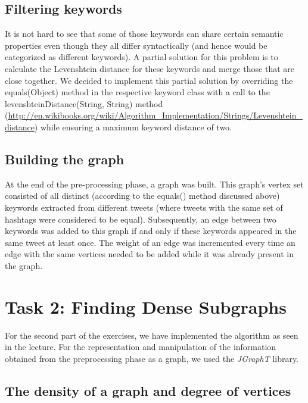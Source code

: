 \documentclass[10pt,a4paper]{article}
\begin{document}
\subsection{Filtering keywords}
It is not hard to see that some of those keywords can share certain semantic properties even though they all differ syntactically (and hence would be categorized as different keywords). A partial solution for this problem is to calculate the Levenshtein distance for these keywords and merge those that are close together. We decided to implement this partial solution by overriding the equals(Object) method in the respective keyword class with a call to the levenshteinDistance(String, String) method (\url{http://en.wikibooks.org/wiki/Algorithm_Implementation/Strings/Levenshtein_distance}) while ensuring a maximum keyword distance of two.
\subsection{Building the graph}
At the end of the pre-processing phase, a graph was built. This graph's vertex set consisted of all distinct (according to the equals() method discussed above) keywords extracted from different tweets (where tweets with the same set of hashtags were considered to be equal). Subsequently, an edge between two keywords was added to this graph if and only if these keywords appeared in the same tweet at least once. The weight of an edge was incremented every time an edge with the same vertices needed to be added while it was already present in the graph.
\section{Task 2: Finding Dense Subgraphs}

For the second part of the exercises, we have implemented the algorithm as seen in the lecture.
For the representation and manipulation of the information obtained from the preprocessing phase as a graph, we used the \emph{JGraphT} library.

\subsection{The density of a graph and degree of vertices}
\end{document}
